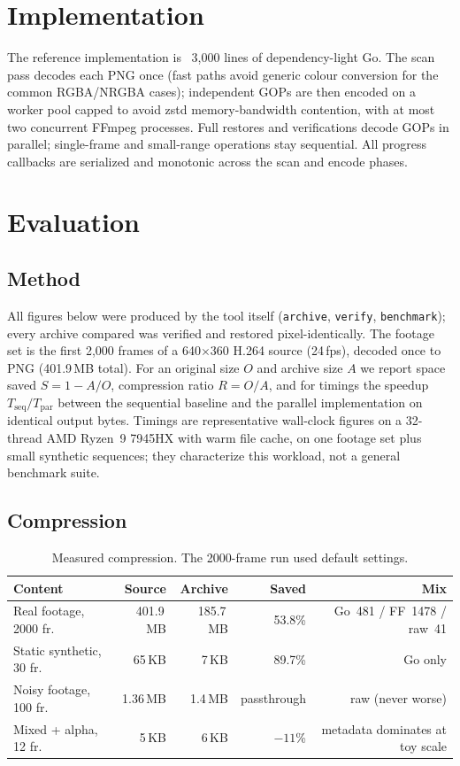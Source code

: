 \documentclass[11pt,a4paper]{article}
\begin{document}
\section{Implementation}

The reference implementation is ~3{,}000 lines of dependency-light Go. The
scan pass decodes each PNG once (fast paths avoid generic colour conversion
for the common RGBA/NRGBA cases); independent GOPs are then encoded on a
worker pool capped to avoid zstd memory-bandwidth contention, with at most two
concurrent FFmpeg processes. Full restores and verifications decode GOPs in
parallel; single-frame and small-range operations stay sequential. All progress
callbacks are serialized and monotonic across the scan and encode phases.

\section{Evaluation}
\label{sec:eval}

\subsection{Method}

All figures below were produced by the tool itself (\texttt{archive},
\texttt{verify}, \texttt{benchmark}); every archive compared was verified and
restored pixel-identically. The footage set is the first 2{,}000 frames of a
640$\times$360 H.264 source (24\,fps), decoded once to PNG (401.9\,MB total).
For an original size $O$ and archive size $A$ we report space saved
$S = 1 - A/O$, compression ratio $R = O/A$, and for timings the speedup
$T_{\text{seq}}/T_{\text{par}}$ between the sequential baseline and the
parallel implementation on identical output bytes. Timings are representative
wall-clock figures on a 32-thread AMD Ryzen~9 7945HX with warm file cache,
on one footage set plus small synthetic sequences; they characterize this
workload, not a general benchmark suite.

\subsection{Compression}

\begin{table}[h]
\centering
\begin{tabular}{@{}lrrrr@{}}
\toprule
Content & Source & Archive & Saved & Mix \\
\midrule
Real footage, 2000 fr. & 401.9\,MB & 185.7\,MB & 53.8\% & Go~481 / FF~1478 / raw~41 \\
Static synthetic, 30 fr. & 65\,KB & 7\,KB & 89.7\% & Go only \\
Noisy footage, 100 fr. & 1.36\,MB & 1.4\,MB & passthrough & raw (never worse) \\
Mixed + alpha, 12 fr. & 5\,KB & 6\,KB & $-11$\% & metadata dominates at toy scale \\
\bottomrule
\end{tabular}
\caption{Measured compression. The 2000-frame run used default settings.}
\label{tab:compression}
\end{table}
\end{document}
